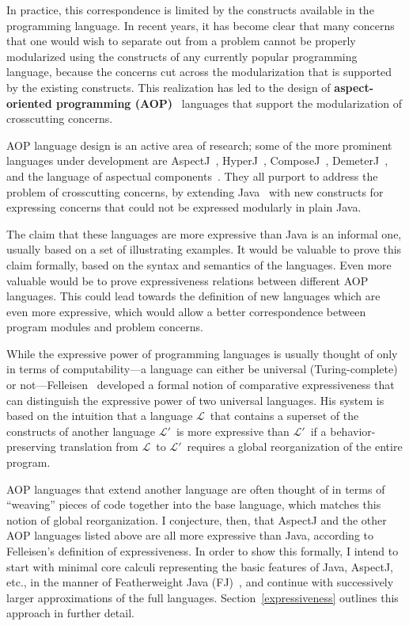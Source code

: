 \documentclass{article}
\newcommand{\defn}[1]{\textbf{#1}}
\newcommand{\Lplain}{\ensuremath{\mathcal{L}}}
\newcommand{\Lprime}{\ensuremath{\Lplain'}}
\begin{document}
In practice, this correspondence is limited by the constructs
available in the programming language.  In recent years, it has become
clear that many concerns that one would wish to separate out from a
problem cannot be properly modularized using the constructs of any
currently popular programming language, because the concerns cut
across the modularization that is supported by the existing
constructs.  This realization has led to the design of
\defn{aspect-oriented programming (AOP)}~\cite{AOP} languages that
support the modularization of crosscutting concerns.

AOP language design is an active area of research; some of the more
prominent languages under development are AspectJ~\cite{AspectJ},
HyperJ~\cite{HyperJ}, ComposeJ~\cite{ComposeJ},
DemeterJ~\cite{DemeterJ}, and the language of aspectual
components~\cite{ACs}.  They all purport to address the problem of
crosscutting concerns, by extending Java~\cite{JLS} with new
constructs for expressing concerns that could not be expressed
modularly in plain Java.

The claim that these languages are more expressive than Java is an
informal one, usually based on a set of illustrating examples.  It
would be valuable to prove this claim formally, based on the syntax
and semantics of the languages.  Even more valuable would be to prove
expressiveness relations between different AOP languages.  This could
lead towards the definition of new languages which are even more
expressive, which would allow a better correspondence between program
modules and problem concerns.

While the expressive power of programming languages is usually thought
of only in terms of computability---a language can either be universal
(Turing-complete) or not---Felleisen~\cite{expressive-power}
developed a formal notion of comparative expressiveness that can
distinguish the expressive power of two universal languages.  His
system is based on the intuition that a language \Lplain\ that contains
a superset of the constructs of another language \Lprime\ is more
expressive than \Lprime\ if a behavior-preserving translation from
\Lplain\ to \Lprime\ requires a global reorganization of the entire
program.

AOP languages that extend another language are often thought of in
terms of ``weaving'' pieces of code together into the base language,
which matches this notion of global reorganization.  I conjecture,
then, that AspectJ and the other AOP languages listed above are all
more expressive than Java, according to Felleisen's definition of
expressiveness.  In order to show this formally, I intend to start
with minimal core calculi representing the basic features of Java,
AspectJ, etc., in the manner of Featherweight Java (FJ)~\cite{FJ}, and
continue with successively larger approximations of the full
languages.  Section~\ref{expressiveness} outlines this approach in
further detail.
\end{document}

